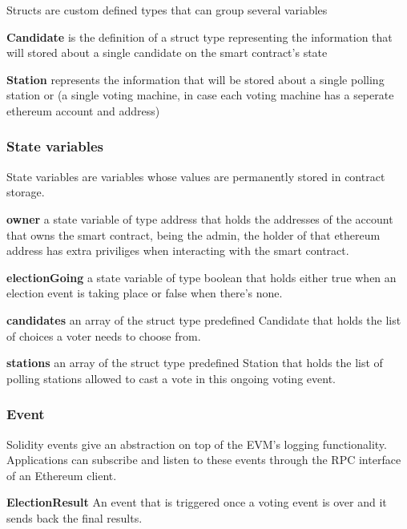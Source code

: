 Structs are custom defined types that can group several variables

\begin{list}{}{}
\item \textbf{Candidate} is the definition of a struct type representing the information that will stored about a single candidate on the smart contract's state
\item \textbf{Station} represents the information that will be stored about a single polling station or (a single voting machine, in case each voting machine has a seperate ethereum account and address)
\end{list}

\subsubsection{State variables}

State variables are variables whose values are permanently stored in contract storage.

\begin{list}{}{}
\item \textbf{owner} a state variable of type address that holds the addresses of the account that owns the smart contract, being the admin, the holder of that ethereum address has extra priviliges when interacting with the smart contract. 
\item \textbf{electionGoing} a state variable of type boolean that holds either true when an election event is taking place or false when there's none.
\item \textbf{candidates} an array of the struct type predefined Candidate that holds the list of choices a voter needs to choose from.
\item \textbf{stations} an array of the struct type predefined Station that holds the list of polling stations allowed to cast a vote in this ongoing voting event.
\end{list}

\subsubsection{Event}

Solidity events give an abstraction on top of the EVM’s logging functionality. Applications can subscribe and listen to these events through the RPC interface of an Ethereum client.

\begin{list}{}{}
\item \textbf{ElectionResult} An event that is triggered once a voting event is over and it sends back the final results.
\end{list}

